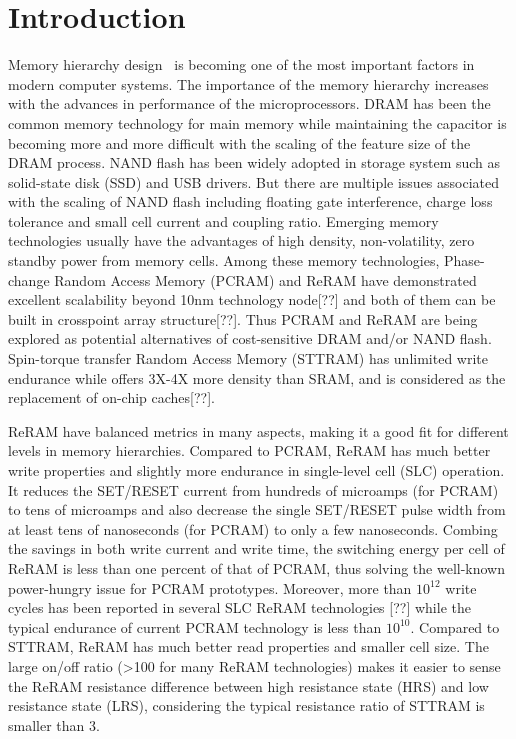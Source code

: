 \section{Introduction} \label{sec:intro}

Memory hierarchy design~\cite{CACTI51} is becoming one of the most important factors in modern computer systems. The importance of the memory hierarchy increases with the advances in performance of the microprocessors. DRAM has been the common memory technology for main memory while maintaining the capacitor is becoming more and more difficult with the scaling of the feature size of the DRAM process. NAND flash has been widely adopted in storage system such as solid-state disk (SSD) and USB drivers. But there are multiple issues associated with the scaling of NAND flash including floating gate interference, charge loss tolerance and small cell current and coupling ratio. Emerging memory technologies usually have the advantages of high density, non-volatility, zero standby power from memory cells. Among these memory technologies, Phase-change Random Access Memory (PCRAM) and ReRAM have demonstrated excellent scalability beyond 10nm technology node[??] and both of them can be built in crosspoint array structure[??]. Thus PCRAM and ReRAM are being explored as potential alternatives of cost-sensitive DRAM and/or NAND flash. Spin-torque transfer Random Access Memory (STTRAM) has unlimited write endurance while offers 3X-4X more density than SRAM, and is considered as the replacement of on-chip caches[??].

ReRAM have balanced metrics in many aspects, making it a good fit for different levels in memory hierarchies. Compared to PCRAM, ReRAM has much better write properties and slightly more endurance in single-level cell (SLC) operation. It reduces the SET/RESET current from hundreds of microamps (for PCRAM) to tens of microamps and also decrease the single SET/RESET pulse width from at least tens of nanoseconds (for PCRAM) to only a few nanoseconds. Combing the savings in both write current and write time, the switching energy per cell of ReRAM is less than one percent of that of PCRAM, thus solving the well-known power-hungry issue for PCRAM prototypes. Moreover, more than $10^{12}$ write cycles has been reported in several SLC ReRAM technologies [??] while the typical endurance of current PCRAM technology is less than $10^{10}$. Compared to STTRAM, ReRAM has much better read properties and smaller cell size. The large on/off ratio (>100 for many ReRAM technologies) makes it easier to sense the ReRAM resistance difference between high resistance state (HRS) and low resistance state (LRS), considering the typical resistance ratio of STTRAM is smaller than 3.

